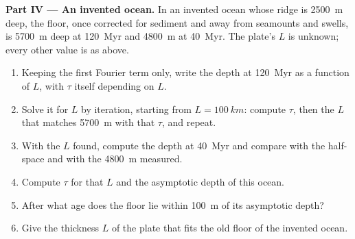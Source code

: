 \begin{problem}
\medskip\noindent\textbf{Part IV --- An invented ocean.} In an invented ocean
whose ridge is \qty{2500}{m} deep, the floor, once corrected for sediment
and away from seamounts and swells, is \qty{5700}{m} deep at \qty{120}{Myr} and
\qty{4800}{m} at \qty{40}{Myr}. The plate's $L$ is unknown; every other value
is as above.
\begin{enumerate}[resume]
  \item Keeping the first Fourier term only, write the depth at
        \qty{120}{Myr} as a function of $L$, with $\tau$ itself depending on
        $L$.
  \item Solve it for $L$ by iteration, starting from $L = \qty{100}{km}$:
        compute $\tau$, then the $L$ that matches \qty{5700}{m} with that
        $\tau$, and repeat.
  \item With the $L$ found, compute the depth at \qty{40}{Myr} and compare
        with the half-space and with the \qty{4800}{m} measured.
  \item Compute $\tau$ for that $L$ and the asymptotic depth of this ocean.
  \item After what age does the floor lie within \qty{100}{m} of its
        asymptotic depth?
  \item Give the thickness $L$ of the plate that fits the old floor of the
        invented ocean.
\end{enumerate}
\end{problem}
